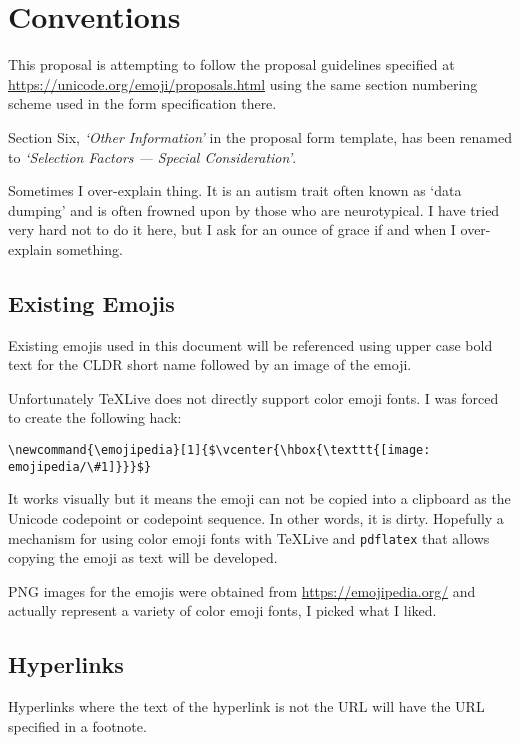 \section*{Conventions}

This proposal is attempting to follow the proposal guidelines specified at
\url{https://unicode.org/emoji/proposals.html} using the same section numbering
scheme used in the form specification there.

Section Six, \textit{`Other Information'} in the proposal form template, has been renamed to
\textit{`Selection Factors --- Special Consideration'}.

Sometimes I over-explain thing. It is an autism trait often known as `data dumping' and
is often frowned upon by those who are neurotypical. I have tried very hard not to do
it here, but I ask for an ounce of grace if and when I over-explain something.

\subsection*{Existing Emojis}

Existing emojis used in this document will be referenced using upper case bold text for the CLDR short name
followed by an image of the emoji.

Unfortunately \TeX{}Live does not directly support color emoji fonts. I was forced to
create the following hack:

\begin{verbatim}
\newcommand{\emojipedia}[1]{$\vcenter{\hbox{\texttt{[image: emojipedia/\#1]}}}$}
\end{verbatim}

It works visually but it means the emoji can not be copied into a clipboard as the
Unicode codepoint or codepoint sequence. In other words, it is dirty. Hopefully a
mechanism for using color emoji fonts with \TeX{}Live and \texttt{pdflatex} that
allows copying the emoji as text will be developed.

PNG images for the emojis were obtained from \url{https://emojipedia.org/} and actually
represent a variety of color emoji fonts, I picked what I liked.

\subsection*{Hyperlinks}

Hyperlinks where the text of the hyperlink is not the URL will have the URL specified
in a footnote.

